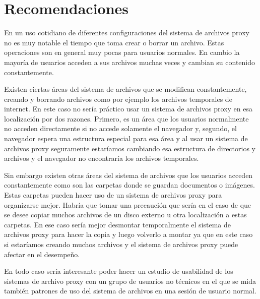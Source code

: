 \section{Recomendaciones}

En un uso cotidiano de diferentes configuraciones del sistema de archivos proxy no es muy notable el tiempo que toma crear o borrar un archivo. Estas operaciones son en general muy pocas para usuarios normales. En cambio la mayoría de usuarios acceden a sus archivos muchas veces y cambian su contenido constantemente. 

Existen ciertas áreas del sistema de archivos que se modifican constantemente, creando y borrando archivos como por ejemplo los archivos temporales de internet. En este caso no sería práctico usar un sistema de archivos proxy en esa localización por dos razones. Primero, es un área que los usuarios normalmente no acceden directamente si no accede solamente el navegador y, segundo, el navegador espera una estructura especial para esa área y al usar un sistema de archivos proxy seguramente estaríamos cambiando esa estructura de directorios y archivos y el navegador no encontraría los archivos temporales. 

Sin embargo existen otras áreas del sistema de archivos que los usuarios acceden constantemente como son las carpetas donde se guardan documentos o imágenes. Estas carpetas pueden hacer uso de un sistema de archivos proxy para organizarse mejor. Habría que tomar una precaución que sería en el caso de que se desee copiar muchos archivos de un disco externo u otra localización a estas carpetas. En ese caso sería mejor desmontar temporalmente el sistema de archivos proxy para hacer la copia y luego volverlo a montar ya que en este caso si estaríamos creando muchos archivos y el sistema de archivos proxy puede afectar en el desempeño. 

En todo caso sería interesante poder hacer un estudio de usabilidad de los sistemas de archivo proxy con un grupo de usuarios no técnicos en el que se mida también patrones de uso del sistema de archivos en una sesión de usuario normal.





